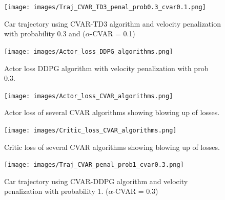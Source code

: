 \begin{figure}[t]
        \centering
        \texttt{[image: images/Traj\_CVAR\_TD3\_penal\_prob0.3\_cvar0.1.png]}
        \caption{Car trajectory using CVAR-TD3 algorithm and velocity penalization with probability 0.3 and ($\alpha$-CVAR = 0.1)}
        \label{traj_cvar_td3_probpenal0.3_cvar0.1}
    
\end{figure}

\begin{figure}[t]
    \begin{minipage}[t]{.5\textwidth}
        \centering
        \texttt{[image: images/Actor\_loss\_DDPG\_algorithms.png]}
        \caption{Actor loss DDPG algorithm with velocity penalization with prob 0.3.}
        \label{ddpg_actor_loss}
    \end{minipage}%
    \hfill%
    \begin{minipage}[t]{.5\textwidth}
        \centering
        \texttt{[image: images/Actor\_loss\_CVAR\_algorithms.png]}
        \caption{Actor loss of several CVAR algorithms showing blowing up of losses.}
        \label{cvar_actor_loss}
    \end{minipage}
\end{figure}


\begin{figure}[t]
        \centering
        \texttt{[image: images/Critic\_loss\_CVAR\_algorithms.png]}
        \caption{Critic loss of several CVAR algorithms showing blowing up of losses.}
        \label{cvar_critic_loss}
    
\end{figure}
\begin{figure}[t]
        \centering
        \texttt{[image: images/Traj\_CVAR\_penal\_prob1\_cvar0.3.png]}
        \caption{Car trajectory using CVAR-DDPG algorithm and velocity penalization with probability 1. ($\alpha$-CVAR = 0.3)}
        \label{traj_cvarddpg_probpenal1_cvar0.3}
    
\end{figure}